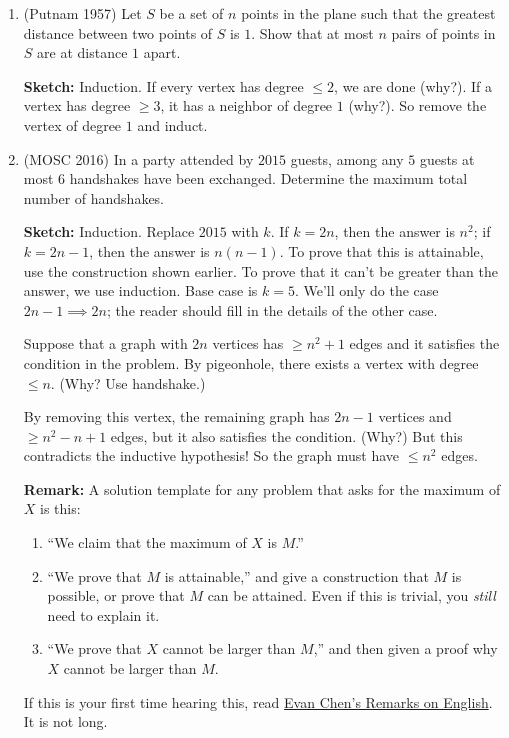 \documentclass[11pt,paper=letter]{scrartcl}
\begin{document}
\begin{enumerate}
  \item (Putnam 1957) Let $S$ be a set of $n$ points in the plane such that the greatest distance between two points of $S$ is $1$. Show that at most $n$ pairs of points in $S$ are at distance $1$ apart.

  \textbf{Sketch:} Induction. If every vertex has degree $\le 2$, we are done (why?). If a vertex has degree $\ge 3$, it has a neighbor of degree $1$ (why?). So remove the vertex of degree $1$ and induct.

  \item (MOSC 2016) In a party attended by $2015$ guests, among any $5$ guests at most $6$ handshakes have been exchanged. Determine the maximum total number of handshakes.

  \textbf{Sketch:} Induction. Replace $2015$ with $k$. If $k = 2n$, then the answer is $n^2$; if $k = 2n - 1$, then the answer is $n(n-1)$. To prove that this is attainable, use the construction shown earlier. To prove that it can't be greater than the answer, we use induction. Base case is $k = 5$. We'll only do the case $2n - 1 \implies 2n$; the reader should fill in the details of the other case.

  Suppose that a graph with $2n$ vertices has $\ge n^2 + 1$ edges and it satisfies the condition in the problem. By pigeonhole, there exists a vertex with degree $\le n$. (Why? Use handshake.)

  By removing this vertex, the remaining graph has $2n-1$ vertices and $\ge n^2 - n + 1$ edges, but it also satisfies the condition. (Why?) But this contradicts the inductive hypothesis! So the graph must have $\le n^2$ edges.

  \textbf{Remark:} A solution template for any problem that asks for the maximum of $X$ is this:
  \begin{enumerate}
    \item ``We claim that the maximum of $X$ is $M$.''
    \item ``We prove that $M$ is attainable,'' and give a construction that $M$ is possible, or prove that $M$ can be attained. Even if this is trivial, you \emph{still} need to explain it.
    \item ``We prove that $X$ cannot be larger than $M$,'' and then given a proof why $X$ cannot be larger than $M$. 
  \end{enumerate}
  If this is your first time hearing this, read \href{http://web.evanchen.cc/handouts/english/english.pdf}{Evan Chen's Remarks on English}. It is not long.


\end{enumerate}
\end{document}
